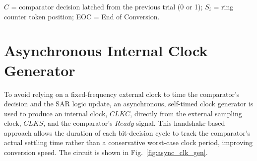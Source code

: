 \noindent\small$C$ = comparator decision latched from the previous trial (0 or 1);
$S_i$ = ring counter token position; EOC = End of Conversion.
\newpage
\section{Asynchronous Internal Clock Generator}

\label{sec:async_clk_gen}

To avoid relying on a fixed-frequency external clock to time the
comparator's decision and the SAR logic update, an asynchronous,
self-timed clock generator is used to produce an internal clock, $CLKC$,
directly from the external sampling clock, $CLKS$, and the comparator's
$Ready$ signal. This handshake-based approach allows the duration of each
bit-decision cycle to track the comparator's actual settling time rather
than a conservative worst-case clock period, improving conversion speed.
The circuit is shown in Fig.~\ref{fig:async_clk_gen}.

